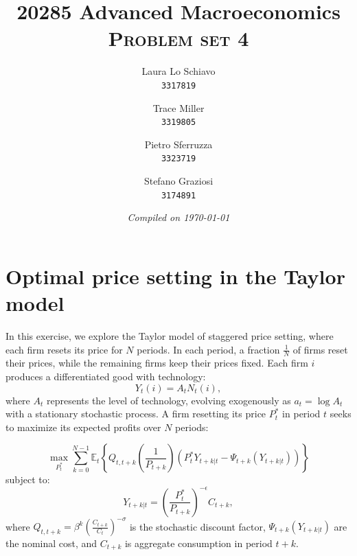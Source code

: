 \documentclass[dvipsnames,11pt]{article}
\title{20285 Advanced Macroeconomics \\[0.5cm] \Huge \textsc{Problem set 4}}
\author{
        Laura Lo Schiavo \\
        \texttt{3317819}
        \and 
        Trace Miller \\
        \texttt{3319805}
        \and 
        Pietro Sferruzza \\
        \texttt{3323719}
        \and
        Stefano Graziosi\\
        \texttt{3174891}
        }
\date{\emph{Compiled on \today}}
\begin{document}
\maketitle

\tableofcontents

\section{Optimal price setting in the Taylor model} 

    In this exercise, we explore the Taylor model of staggered price setting, where each firm resets its price for \( N \) periods. In each period, a fraction \( \frac{1}{N} \) of firms reset their prices, while the remaining firms keep their prices fixed. 
    Each firm \( i \) produces a differentiated good with technology:
    \[
    Y_t(i) = A_t N_t(i),
    \]
    where \( A_t \) represents the level of technology, evolving exogenously as \( a_t = \log A_t \) with a stationary stochastic process. A firm resetting its price \( P_t^* \) in period \( t \) seeks to maximize its expected profits over \( N \) periods:
    
    \[
    \max_{P_t^*} \sum_{k=0}^{N-1} \mathbb{E}_t \left\{ Q_{t,t+k} \left( \frac{1}{P_{t+k}} \right) \left( P_t^* Y_{t+k|t} - \Psi_{t+k}(Y_{t+k|t}) \right) \right\}
    \]
    subject to:
    \[
    Y_{t+k|t} = \left( \frac{P_t^*}{P_{t+k}} \right)^{-\epsilon} C_{t+k},
    \]
    where \( Q_{t,t+k} = \beta^k \left( \frac{C_{t+k}}{C_t} \right)^{-\sigma} \) is the stochastic discount factor, $ \Psi_{t+k}(Y_{t+k|t})$ are the nominal cost, and \( C_{t+k} \) is aggregate consumption in period \( t+k \).
    
\end{document}
